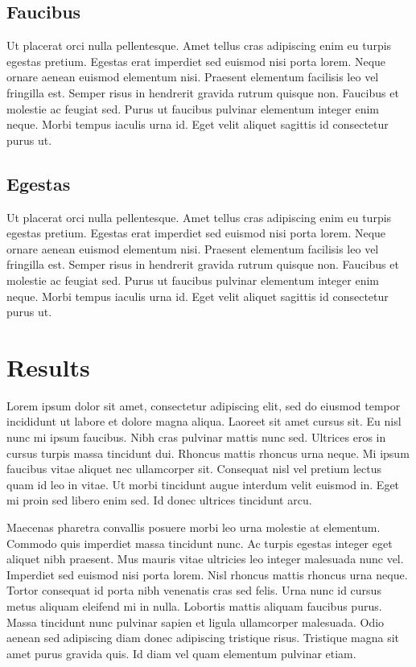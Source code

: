 \documentclass{article}
\begin{document}
\subsection{Faucibus}

Ut placerat orci nulla pellentesque. Amet tellus cras adipiscing enim eu turpis egestas pretium. Egestas erat imperdiet sed euismod nisi porta lorem. Neque ornare aenean euismod elementum nisi. Praesent elementum facilisis leo vel fringilla est. Semper risus in hendrerit gravida rutrum quisque non. Faucibus et molestie ac feugiat sed. Purus ut faucibus pulvinar elementum integer enim neque. Morbi tempus iaculis urna id. Eget velit aliquet sagittis id consectetur purus ut.


\subsection{Egestas}

Ut placerat orci nulla pellentesque. Amet tellus cras adipiscing enim eu turpis egestas pretium. Egestas erat imperdiet sed euismod nisi porta lorem. Neque ornare aenean euismod elementum nisi. Praesent elementum facilisis leo vel fringilla est. Semper risus in hendrerit gravida rutrum quisque non. Faucibus et molestie ac feugiat sed. Purus ut faucibus pulvinar elementum integer enim neque. Morbi tempus iaculis urna id. Eget velit aliquet sagittis id consectetur purus ut.

\section{Results}

Lorem ipsum dolor sit amet, consectetur adipiscing elit, sed do eiusmod tempor incididunt ut labore et dolore magna aliqua. Laoreet sit amet cursus sit. Eu nisl nunc mi ipsum faucibus. Nibh cras pulvinar mattis nunc sed. Ultrices eros in cursus turpis massa tincidunt dui. Rhoncus mattis rhoncus urna neque. Mi ipsum faucibus vitae aliquet nec ullamcorper sit. Consequat nisl vel pretium lectus quam id leo in vitae. Ut morbi tincidunt augue interdum velit euismod in. Eget mi proin sed libero enim sed. Id donec ultrices tincidunt arcu.

Maecenas pharetra convallis posuere morbi leo urna molestie at elementum. Commodo quis imperdiet massa tincidunt nunc. Ac turpis egestas integer eget aliquet nibh praesent. Mus mauris vitae ultricies leo integer malesuada nunc vel. Imperdiet sed euismod nisi porta lorem. Nisl rhoncus mattis rhoncus urna neque. Tortor consequat id porta nibh venenatis cras sed felis. Urna nunc id cursus metus aliquam eleifend mi in nulla. Lobortis mattis aliquam faucibus purus. Massa tincidunt nunc pulvinar sapien et ligula ullamcorper malesuada. Odio aenean sed adipiscing diam donec adipiscing tristique risus. Tristique magna sit amet purus gravida quis. Id diam vel quam elementum pulvinar etiam.
\end{document}
